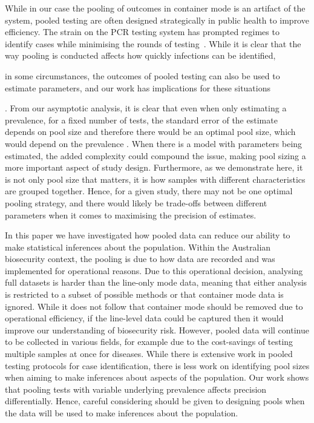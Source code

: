 \documentclass{article}
\newif\ifproofread
\newcommand{\rev}[1]{%
\ifproofread
\hl{#1}%
\else
#1%
\fi
}
\begin{document}
While in our case the pooling of outcomes in container mode is an artifact of the system, pooled testing are often designed strategically in public health to improve efficiency. The strain on the PCR testing system has prompted regimes to identify cases while minimising the rounds of testing~\citep{mutesa_pooled_2021}. While it is clear that the way pooling is conducted affects how quickly infections can be identified, \rev{in some circumstances, the outcomes of pooled testing can also be used to estimate parameters, and our work has implications for these situations} \citep{delaigle_nonparametric_2015, chatterjee_regression_2020, mcmahan_bayesian_2017, liu_generalized_2020}. From our asymptotic analysis, it is clear that even when only estimating a prevalence, for a fixed number of tests, the standard error of the estimate depends on pool size and therefore there would be an optimal pool size, which would depend on the prevalence  \citep{keeling2022modeling}. When there is a model with parameters being estimated, the added complexity could compound the issue, making pool sizing a more important aspect of study design. Furthermore, as we demonstrate here, it is not only pool size that matters, it is how samples with different characteristics are grouped together. Hence, for a given study, there may not be one optimal pooling strategy, and there would likely be trade-offs between different parameters when it comes to maximising the precision of estimates. 

\rev{In this paper we have investigated how pooled data can reduce our ability to make statistical inferences about the population. Within the Australian biosecurity context, the pooling is due to how data are recorded and was implemented for operational reasons. Due to this operational decision, analysing full datasets is harder than the line-only mode data, meaning that either analysis is restricted to a subset of possible methods or that container mode data is ignored. While it does not follow that container mode should be removed due to operational efficiency, if the line-level data could be captured then it would improve our understanding of biosecurity risk. 
However, pooled data will continue to be collected in various fields, for example due to the cost-savings of testing multiple samples at once for diseases.
While there is extensive work in pooled testing protocols for case identification, there is less work on identifying pool sizes when aiming to make inferences about aspects of the population.
Our work shows that pooling tests with variable underlying prevalence affects precision differentially. Hence, careful considering should be given to designing pools when the data will be used to make inferences about the population.}


{}
%
\end{document}
